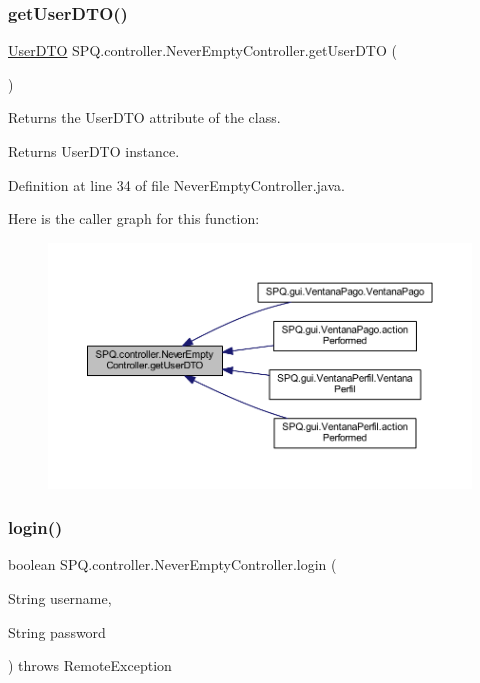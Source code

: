 \subsubsection{\texorpdfstring{get\+User\+D\+T\+O()}{getUserDTO()}}
{\footnotesize\ttfamily \mbox{\hyperlink{class_s_p_q_1_1dto_1_1_user_d_t_o}{User\+D\+TO}} S\+P\+Q.\+controller.\+Never\+Empty\+Controller.\+get\+User\+D\+TO (\begin{DoxyParamCaption}{ }\end{DoxyParamCaption})}

Returns the User\+D\+TO attribute of the class. \begin{DoxyReturn}{Returns}
User\+D\+TO instance. 
\end{DoxyReturn}


Definition at line 34 of file Never\+Empty\+Controller.\+java.

Here is the caller graph for this function\+:
\nopagebreak
\begin{figure}[H]
\begin{center}
\leavevmode
\includegraphics[width=350pt]{class_s_p_q_1_1controller_1_1_never_empty_controller_ac6b9878caf6a1f22117adf18c5ca56b5_icgraph}
\end{center}
\end{figure}
\mbox{\label{class_s_p_q_1_1controller_1_1_never_empty_controller_adb8f5dbbfedb5f3c231de53dccc88899}} 
\subsubsection{\texorpdfstring{login()}{login()}}
{\footnotesize\ttfamily boolean S\+P\+Q.\+controller.\+Never\+Empty\+Controller.\+login (\begin{DoxyParamCaption}\item[{String}]{username,  }\item[{String}]{password }\end{DoxyParamCaption}) throws Remote\+Exception}

